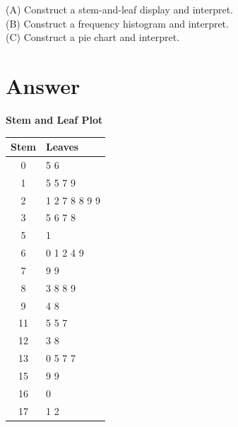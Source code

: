 \documentclass{article}
\begin{document}
\smallskip
\smallskip 

\textsc{(A)} Construct a stem-and-leaf display and interpret.\\
\textsc{(B)} Construct a frequency histogram and interpret.\\
\textsc{(C)} Construct a pie chart and interpret.

\newpage

\section*{Answer}

\textbf{Stem and Leaf Plot}\\

\begin{center}
    \begin{tabular}{|c|l|}
        \hline
        \textbf{Stem} & \textbf{Leaves} \\
        \hline
        0 & 5 6 \\
        \hline
        1 & 5 5 7 9 \\
        \hline
        2 & 1 2 7 8 8 9 9 \\
        \hline
        3 & 5 6 7 8 \\
        \hline
        5 & 1 \\
        \hline
        6 & 0 1 2 4 9 \\
        \hline
        7 & 9 9 \\
        \hline
        8 & 3 8 8 9 \\
        \hline
        9 & 4 8 \\
        \hline
        11 & 5 5 7 \\
        \hline
        12 & 3 8 \\
        \hline
        13 & 0 5 7 7 \\
        \hline
        15 & 9 9 \\
        \hline
        16 & 0 \\
        \hline
        17 & 1 2 \\
        \hline
    \end{tabular}

 


\end{center}
\end{document}
